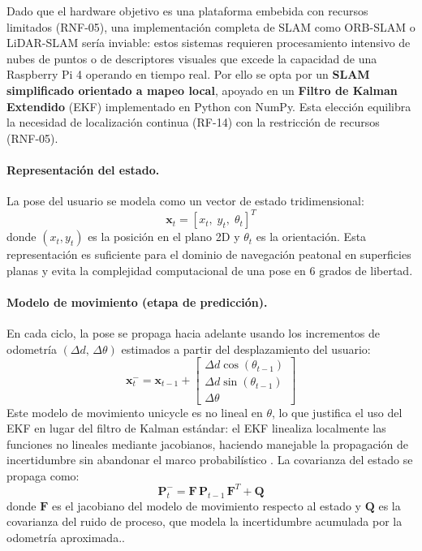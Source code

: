 Dado que el hardware objetivo es una plataforma embebida con recursos limitados
(RNF-05), una implementación completa de SLAM como ORB-SLAM o LiDAR-SLAM sería
inviable: estos sistemas requieren procesamiento intensivo de nubes de puntos o de
descriptores visuales que excede la capacidad de una Raspberry Pi 4 operando en tiempo
real. Por ello se opta por un \textbf{SLAM simplificado orientado a mapeo local},
apoyado en un \textbf{Filtro de Kalman Extendido} (EKF) implementado en Python con
NumPy. Esta elección equilibra la necesidad de localización continua (RF-14) con la
restricción de recursos (RNF-05).

\paragraph{Representación del estado.}
La pose del usuario se modela como un vector de estado tridimensional:
\[
\mathbf{x}_t = [x_t,\; y_t,\; \theta_t]^T
\]
donde $(x_t, y_t)$ es la posición en el plano 2D y $\theta_t$ es la orientación.
Esta representación es suficiente para el dominio de navegación peatonal en superficies
planas y evita la complejidad computacional de una pose en 6 grados de libertad.

\paragraph{Modelo de movimiento (etapa de predicción).}
En cada ciclo, la pose se propaga hacia adelante usando los incrementos de odometría
$(\Delta d,\, \Delta\theta)$ estimados a partir del desplazamiento del usuario:
\[
\mathbf{x}_t^{-} = \mathbf{x}_{t-1} +
\begin{bmatrix}
\Delta d \cos(\theta_{t-1}) \\
\Delta d \sin(\theta_{t-1}) \\
\Delta\theta
\end{bmatrix}
\]
Este modelo de movimiento unicycle es no lineal en $\theta$, lo que justifica el uso
del EKF en lugar del filtro de Kalman estándar: el EKF linealiza localmente las
funciones no lineales mediante jacobianos, haciendo manejable la propagación de
incertidumbre sin abandonar el marco probabilístico \cite{thrun2005probabilistic}.
La covarianza del estado se propaga como:
\[
\mathbf{P}_t^{-} = \mathbf{F}\,\mathbf{P}_{t-1}\,\mathbf{F}^T + \mathbf{Q}
\]
donde $\mathbf{F}$ es el jacobiano del modelo de movimiento respecto al estado y
$\mathbf{Q}$ es la covarianza del ruido de proceso, que modela la incertidumbre
acumulada por la odometría aproximada.\cite{thrun2005probabilistic}.

